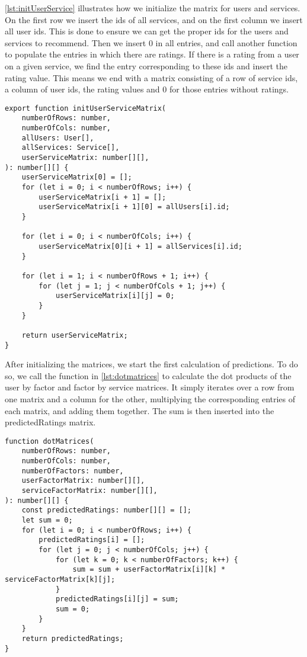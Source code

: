 \autoref{lst:initUserService} illustrates how we initialize the matrix for users and services.
On the first row we insert the ids of all services, and on the first column we insert all user ids.
This is done to ensure we can get the proper ids for the users and services to recommend.
Then we insert 0 in all entries, and call another function to populate the entries in which there are ratings.
If there is a rating from a user on a given service, we find the entry corresponding to these ids and insert the rating value.
This means we end with a matrix consisting of a row of service ids, a column of user ids, the rating values and 0 for those entries without ratings.
\begin{lstlisting}[caption={Initializing the user and service matrix}, captionpos=b, label={lst:initUserService}]
    export function initUserServiceMatrix(
	numberOfRows: number,
	numberOfCols: number,
	allUsers: User[],
	allServices: Service[],
	userServiceMatrix: number[][],
): number[][] {
	userServiceMatrix[0] = [];
	for (let i = 0; i < numberOfRows; i++) {
		userServiceMatrix[i + 1] = [];
		userServiceMatrix[i + 1][0] = allUsers[i].id;
	}

	for (let i = 0; i < numberOfCols; i++) {
		userServiceMatrix[0][i + 1] = allServices[i].id;
	}

	for (let i = 1; i < numberOfRows + 1; i++) {
		for (let j = 1; j < numberOfCols + 1; j++) {
			userServiceMatrix[i][j] = 0;
		}
	}

	return userServiceMatrix;
}
\end{lstlisting}
After initializing the matrices, we start the first calculation of predictions.
To do so, we call the function in \autoref{lst:dotmatrices} to calculate the dot products of the user by factor and factor by service matrices.
It simply iterates over a row from one matrix and a column for the other, multiplying the corresponding entries of each matrix, and adding them together.
The sum is then inserted into the predictedRatings matrix.
\begin{lstlisting}[caption={Calculating the dot predict of a matrix}, captionpos=b, label={lst:dotmatrices}]
function dotMatrices(
    numberOfRows: number,
    numberOfCols: number,
    numberOfFactors: number,
    userFactorMatrix: number[][],
    serviceFactorMatrix: number[][],
): number[][] {
    const predictedRatings: number[][] = [];
    let sum = 0;
    for (let i = 0; i < numberOfRows; i++) {
        predictedRatings[i] = [];
        for (let j = 0; j < numberOfCols; j++) {
            for (let k = 0; k < numberOfFactors; k++) {
                sum = sum + userFactorMatrix[i][k] * serviceFactorMatrix[k][j];
            }
            predictedRatings[i][j] = sum;
            sum = 0;
        }
    } 
    return predictedRatings;
}
\end{lstlisting}
